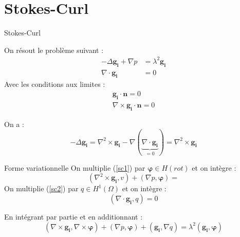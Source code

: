 \documentclass{beamer}
\newcommand{\grad}{{\nabla}}
\newcommand{\laplace}{{\Delta}}
\newcommand{\rot}{{\nabla\times}}
\newcommand{\rott}{{\nabla^2\times}}
\renewcommand{\div}{{\nabla\cdot}}
\begin{document}
\section{Stokes-Curl}
\begin{frame}{Stokes-Curl}
\begin{block}{On résout le problème suivant :}
\begin{align}
-\laplace \bm{g_i} +\grad p &= \lambda^2\bm{g_i}\label{sc1}\\
\div \bm{g_i} &= 0\label{sc2}
\end{align}
Avec les conditions aux limites :
\begin{align}
\bm{g_i}\cdot\bm{n}=0\\
\rot\bm{g_i}\cdot\bm{n}=0
\end{align}
\end{block}
On a :
\[
-\laplace\bm{g_i}=\rott\bm{g_i}-\grad(\underbrace{\div\bm{g_i}}_{=0})=\rott\bm{g_i}
\]
\end{frame}

\begin{frame}{Forme variationnelle}
On multiplie (\ref{sc1}) par $\bm{\varphi}\in H(rot)$ et on intègre :
\[
(\rott\bm{g_i},v)+(\grad p,\bm{\varphi}) = 
\]
On multiplie (\ref{sc2}) par $q\in H^1(\Omega)$ et on intègre :
\[
(\div\bm{g_i},q) = 0
\]
\begin{block}{En intégrant par partie et en additionnant :}
\[
(\rot\bm{g_i},\rot\bm{\varphi}) + (\grad p, \bm{\varphi}) + (\bm{g_i}, \grad q) = \lambda^2(\bm{g_i},\bm{\varphi})
\]
\end{block}
\end{frame}
\end{document}
